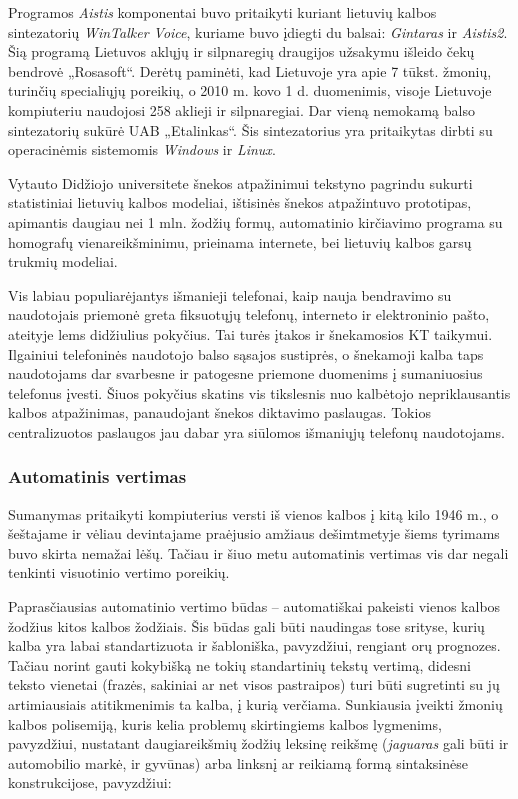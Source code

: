\documentclass[]{../metanetpaper}
\begin{document}
\begin{multicols}{2}
    Programos \textit{Aistis}  komponentai buvo pritaikyti kuriant lietuvių kalbos sintezatorių \textit{WinTalker Voice}, kuriame buvo įdiegti du balsai: \textit{Gintaras}  ir \textit{Aistis2}. Šią programą Lietuvos aklųjų ir silpnaregių draugijos užsakymu išleido čekų bendrovė „Rosasoft“. Derėtų paminėti, kad Lietuvoje yra apie 7 tūkst. žmonių, turinčių specialiųjų poreikių, o 2010 m. kovo 1 d. duomenimis, visoje Lietuvoje kompiuteriu naudojosi 258 aklieji ir silpnaregiai. Dar vieną nemokamą balso sintezatorių sukūrė UAB „Etalinkas“.  Šis sintezatorius yra pritaikytas dirbti su operacinėmis sistemomis \textit{Windows} ir \textit{Linux}.

Vytauto Didžiojo universitete šnekos atpažinimui tekstyno pagrindu sukurti statistiniai lietuvių kalbos modeliai, ištisinės šnekos atpažintuvo prototipas, apimantis daugiau nei 1 mln. žodžių formų, automatinio kirčiavimo programa su homografų vienareikšminimu, prieinama internete, bei lietuvių kalbos garsų trukmių modeliai.

Vis labiau populiarėjantys išmanieji telefonai, kaip nauja bendravimo su naudotojais priemonė greta fiksuotųjų telefonų, interneto ir elektroninio pašto, ateityje lems didžiulius pokyčius. Tai turės įtakos ir šnekamosios KT taikymui. Ilgainiui telefoninės naudotojo balso sąsajos sustiprės, o šnekamoji kalba taps naudotojams dar svarbesne ir patogesne priemone duomenims į sumaniuosius telefonus įvesti. Šiuos pokyčius skatins vis tikslesnis nuo kalbėtojo nepriklausantis kalbos atpažinimas, panaudojant šnekos diktavimo paslaugas. Tokios centralizuotos paslaugos jau dabar yra siūlomos išmaniųjų telefonų naudotojams.

\subsubsection{Automatinis vertimas}

 Sumanymas pritaikyti kompiuterius versti iš vienos kalbos į kitą kilo 1946 m., o šeštajame ir vėliau devintajame praėjusio amžiaus dešimtmetyje šiems tyrimams buvo skirta nemažai lėšų. Tačiau ir šiuo metu automatinis vertimas vis dar negali tenkinti visuotinio vertimo poreikių.


Paprasčiausias automatinio vertimo būdas – automatiškai pakeisti vienos kalbos žodžius kitos kalbos žodžiais. Šis būdas gali būti naudingas tose srityse, kurių kalba yra labai standartizuota ir šabloniška, pavyzdžiui, rengiant orų prognozes. Tačiau norint gauti kokybišką ne tokių standartinių tekstų vertimą, didesni teksto vienetai (frazės, sakiniai ar net visos pastraipos) turi būti sugretinti su jų artimiausiais atitikmenimis ta kalba, į kurią verčiama. Sunkiausia įveikti žmonių kalbos polisemiją, kuris kelia problemų skirtingiems kalbos lygmenims, pavyzdžiui, nustatant daugiareikšmių žodžių leksinę reikšmę (\textit{jaguaras} gali būti ir automobilio markė, ir gyvūnas) arba linksnį ar reikiamą formą sintaksinėse konstrukcijose, pavyzdžiui:


\end{multicols}
\end{document}
